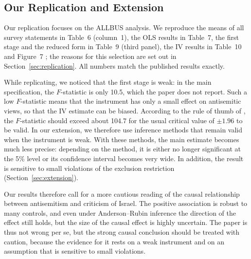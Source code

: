 \subsection{Our Replication and Extension}

Our replication focuses on the ALLBUS analysis. We reproduce the means of all survey statements in Table~6 (column~1), the OLS results in Table~7, the first stage and the reduced form in Table~9 (third panel), the IV results in Table~10 and Figure~7 \citep{binstok2024}; the reasons for this selection are set out in Section~\ref{sec:replication}. All numbers match the published results exactly.

While replicating, we noticed that the first stage is weak: in the main specification, the $F$-statistic is only 10.5, which the paper does not report. Such a low $F$-statistic means that the instrument has only a small effect on antisemitic views, so that the IV estimate can be biased. According to the rule of thumb of \citet{lee2022}, the $F$-statistic should exceed about 104.7 for the usual critical value of $\pm 1.96$ to be valid. In our extension, we therefore use inference methods that remain valid when the instrument is weak. With these methods, the main estimate becomes much less precise: depending on the method, it is either no longer significant at the 5\% level or its confidence interval becomes very wide. In addition, the result is sensitive to small violations of the exclusion restriction (Section~\ref{sec:extension}).

Our results therefore call for a more cautious reading of the causal relationship between antisemitism and criticism of Israel. The positive association is robust to many controls, and even under Anderson--Rubin inference the direction of the effect still holds, but the size of the causal effect is highly uncertain. The paper is thus not wrong per se, but the strong causal conclusion should be treated with caution, because the evidence for it rests on a weak instrument and on an assumption that is sensitive to small violations.